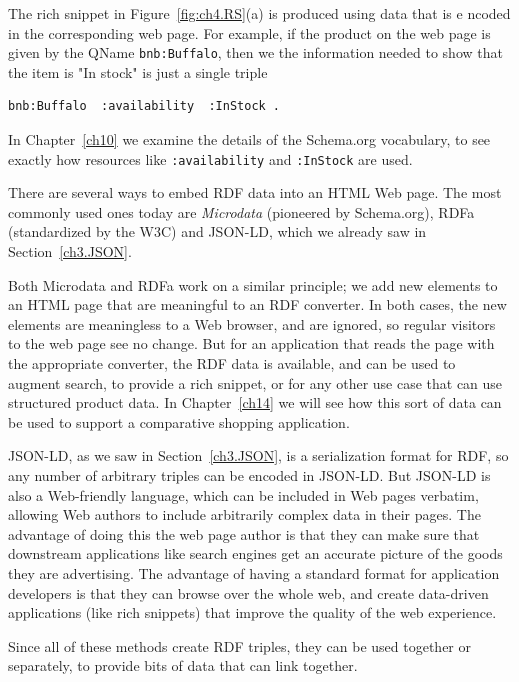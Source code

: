 The rich snippet in Figure~\ref{fig:ch4.RS}(a) is produced using data that is e
ncoded in the corresponding 
web page.  For example, if the product on the web page is given by the QName \texttt{bnb:Buffalo},  
then we the information needed to show that the item is "In stock" is just 
a single triple

\begin{lstlisting}
bnb:Buffalo  :availability  :InStock .
\end{lstlisting}


In Chapter~\ref{ch10} we examine the details of the Schema.org vocabulary, to 
see exactly how  resources like \texttt{:availability} and \texttt{:InStock} are used. 

There are several ways to embed RDF data into an HTML Web page.  The most commonly used ones
today are \emph{Microdata} (pioneered by Schema.org), RDFa (standardized by the W3C)
and JSON-LD, which we already saw in Section~\ref{ch3.JSON}. 

Both Microdata and RDFa work on a similar principle; we add new elements to an 
HTML page that are meaningful to an RDF converter.  In both cases, the new elements
are meaningless to a Web browser, and are ignored, so regular visitors to the
web page see no change.  But for an application that reads the page with the appropriate
converter, the RDF data is available, and can be used to augment search, to provide
a rich snippet, or for any other use case that can use structured product data.  In 
Chapter~\ref{ch14} we will see how this sort of data can be used to support a comparative
shopping application. 

JSON-LD, as we saw in Section~\ref{ch3.JSON}, is a serialization format for RDF, so 
any number of arbitrary triples can be encoded in JSON-LD.  But JSON-LD is also 
a Web-friendly language, which can be included in Web pages verbatim, allowing Web
authors to include arbitrarily complex data in their pages. The advantage of doing this 
the web page author is that they can make sure that downstream applications
like search engines get an accurate picture of the goods they are advertising. 
The advantage of having a standard format for application developers is that they 
can browse over the whole web, and create data-driven applications (like rich snippets)
that improve the quality of the web experience. 

Since all of these methods create RDF triples, they can be used together or 
separately, to provide bits of data that can link together. 


